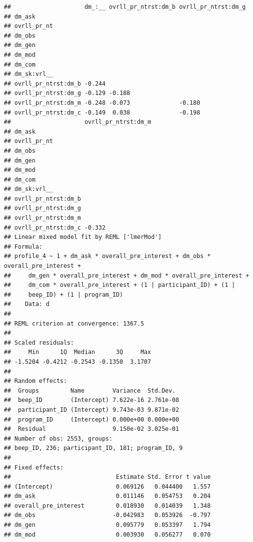 \documentclass[]{msu-thesis}
\theoremstyle{definition}
\theoremstyle{definition}
\theoremstyle{definition}
\theoremstyle{remark}
\begin{document}
\begin{verbatim}
##                     dm_:__ ovrll_pr_ntrst:dm_b ovrll_pr_ntrst:dm_g
## dm_ask                                                            
## ovrll_pr_nt                                                       
## dm_obs                                                            
## dm_gen                                                            
## dm_mod                                                            
## dm_com                                                            
## dm_sk:vrl__                                                       
## ovrll_pr_ntrst:dm_b -0.244                                        
## ovrll_pr_ntrst:dm_g -0.129 -0.188                                 
## ovrll_pr_ntrst:dm_m -0.248 -0.073              -0.180             
## ovrll_pr_ntrst:dm_c -0.149  0.038              -0.198             
##                     ovrll_pr_ntrst:dm_m
## dm_ask                                 
## ovrll_pr_nt                            
## dm_obs                                 
## dm_gen                                 
## dm_mod                                 
## dm_com                                 
## dm_sk:vrl__                            
## ovrll_pr_ntrst:dm_b                    
## ovrll_pr_ntrst:dm_g                    
## ovrll_pr_ntrst:dm_m                    
## ovrll_pr_ntrst:dm_c -0.332             
## Linear mixed model fit by REML ['lmerMod']
## Formula: 
## profile_4 ~ 1 + dm_ask * overall_pre_interest + dm_obs * overall_pre_interest +  
##     dm_gen * overall_pre_interest + dm_mod * overall_pre_interest +  
##     dm_com * overall_pre_interest + (1 | participant_ID) + (1 |  
##     beep_ID) + (1 | program_ID)
##    Data: d
## 
## REML criterion at convergence: 1367.5
## 
## Scaled residuals: 
##     Min      1Q  Median      3Q     Max 
## -1.5204 -0.4212 -0.2543 -0.1350  3.1707 
## 
## Random effects:
##  Groups         Name        Variance  Std.Dev. 
##  beep_ID        (Intercept) 7.622e-16 2.761e-08
##  participant_ID (Intercept) 9.743e-03 9.871e-02
##  program_ID     (Intercept) 0.000e+00 0.000e+00
##  Residual                   9.150e-02 3.025e-01
## Number of obs: 2553, groups:  
## beep_ID, 236; participant_ID, 181; program_ID, 9
## 
## Fixed effects:
##                              Estimate Std. Error t value
## (Intercept)                  0.069126   0.044400   1.557
## dm_ask                       0.011146   0.054753   0.204
## overall_pre_interest         0.018930   0.014039   1.348
## dm_obs                      -0.042983   0.053926  -0.797
## dm_gen                       0.095779   0.053397   1.794
## dm_mod                       0.003930   0.056277   0.070

\end{verbatim}
\end{document}
